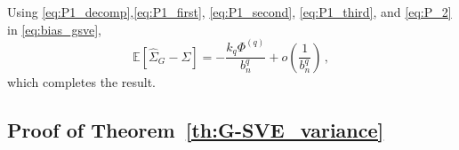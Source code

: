 \documentclass[11pt]{article}
\theoremstyle{remark}
\begin{document}
%
Using \eqref{eq:P1_decomp},\eqref{eq:P1_first}, \eqref{eq:P1_second}, \eqref{eq:P1_third}, and \eqref{eq:P_2} in \eqref{eq:bias_gsve},
\[
\mathbb{E} \left[\hat{\Sigma}_{G} - \Sigma \right] = -\dfrac{k_q \Phi^{(q)} }{b_n^q} + o\left( \dfrac{1}{b_n^q} \right)\,,
\]
which completes the result.
%

\subsection{Proof of Theorem~\ref{th:G-SVE_variance}}
\label{appendix:variance}
 
\end{document}

